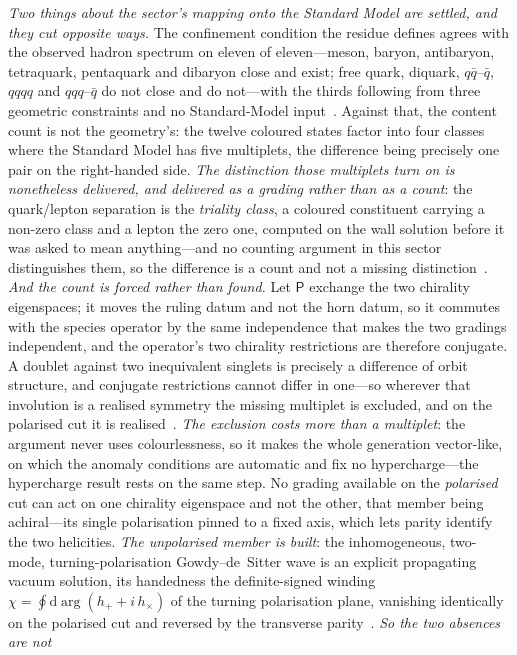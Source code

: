 \documentclass[11pt,a4paper]{article}
\theoremstyle{plain}
\theoremstyle{definition}
\theoremstyle{remark}
\newcommand{\dd}{\mathrm{d}}
\begin{document}
\begin{enumerate}
\emph{Two things about the sector's mapping onto the Standard Model are settled, and they cut opposite ways.}  The
confinement condition the residue defines agrees with the observed hadron spectrum
on eleven of eleven---meson, baryon, antibaryon, tetraquark, pentaquark and dibaryon
close and exist; free quark, diquark, $q\bar q$--$\bar q$, $qqqq$ and $qqq$--$\bar q$ do not
close and do not---with the thirds following from three geometric constraints and no
Standard-Model input~\cite{JanzenMatter}.  Against that, the content count is not the geometry's: the twelve coloured states factor into four classes where the Standard
Model has five multiplets, the difference being precisely one pair on the right-handed side.
\emph{The distinction those multiplets turn on is nonetheless delivered, and delivered as a grading
rather than as a count}: the quark/lepton separation is the \emph{triality class}, a coloured
constituent carrying a non-zero class and a lepton the zero one, computed on the wall solution before
it was asked to mean anything---and no counting argument in this sector distinguishes them, so the
difference is a count and not a missing distinction~\cite{JanzenMatter}.  \emph{And the count is
forced rather than found.}  Let $\mathsf{P}$ exchange the two chirality eigenspaces; it moves the
ruling datum and not the horn datum, so it commutes with the species operator by the same
independence that makes the two gradings independent, and the operator's two chirality
restrictions are therefore conjugate.  A doublet against two inequivalent singlets is precisely a
difference of orbit structure, and conjugate restrictions cannot differ in one---so wherever that
involution is a realised symmetry the missing multiplet is excluded, and on the polarised cut it
is realised~\cite{JanzenMatter}.  \emph{The exclusion costs more than a multiplet}: the argument
never uses colourlessness, so it makes the whole generation vector-like, on which the anomaly
conditions are automatic and fix no hypercharge---the hypercharge result rests on the same step.  No grading available on the
\emph{polarised} cut can act on one chirality eigenspace and not the other, that member being
achiral---its single polarisation pinned to a fixed axis, which lets parity identify the two
helicities.  \emph{The unpolarised member is built}: the inhomogeneous, two-mode, turning-polarisation
Gowdy--de~Sitter wave is an explicit propagating vacuum solution, its handedness the definite-signed
winding $\chi=\oint\dd\arg(h_++i\,h_\times)$ of the turning polarisation plane, vanishing identically
on the polarised cut and reversed by the transverse parity~\cite{JanzenDynamics}.  \emph{So the two absences are not
}
\end{enumerate}
\end{document}
